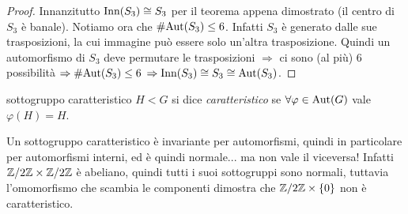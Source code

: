 \begin{proof}
    Innanzitutto $\text{Inn}(S_3) \cong S_3$ per il teorema appena dimostrato (il centro di $S_3$ è banale). Notiamo ora che $\#\text{Aut}(S_3) \leq 6$. Infatti $S_3$ è generato dalle sue trasposizioni, la cui immagine può essere solo un'altra trasposizione. Quindi un automorfismo di $S_3$ deve permutare le trasposizioni $\Rightarrow$ ci sono (al più) 6 possibilità $\Rightarrow \#\text{Aut}(S_3) \leq 6$ $\Rightarrow \text{Inn}(S_3) \cong S_3 \cong \text{Aut}(S_3)$.
\end{proof}
\begin{definition}{sottogruppo caratteristico}
    $H < G$ si dice \textit{caratteristico} se $\forall \varphi \in \text{Aut}(G)$ vale $\varphi(H)=H$.
\end{definition}

Un sottogruppo caratteristico è invariante per automorfismi, quindi in particolare per automorfismi interni, ed è quindi normale... ma non vale il viceversa! Infatti $\mathbb{Z}/2\mathbb{Z} \times \mathbb{Z}/2\mathbb{Z}$ è abeliano, quindi tutti i suoi sottogruppi sono normali, tuttavia l'omomorfismo che scambia le componenti dimostra che $\mathbb{Z}/2\mathbb{Z} \times \left\{ 0 \right\}$ non è caratteristico.

